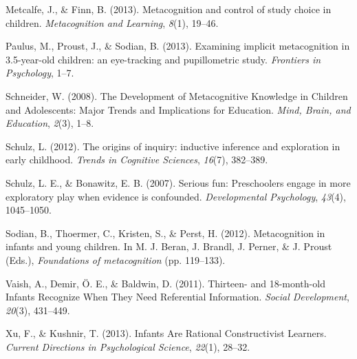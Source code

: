 \documentclass[10pt, letterpaper]{article}
\begin{document}
\hypertarget{ref-Metcalfe2013}{}
Metcalfe, J., \& Finn, B. (2013). Metacognition and control of study
choice in children. \emph{Metacognition and Learning}, \emph{8}(1),
19--46.

\hypertarget{ref-Paulus2013}{}
Paulus, M., Proust, J., \& Sodian, B. (2013). Examining implicit
metacognition in 3.5-year-old children: an eye-tracking and
pupillometric study. \emph{Frontiers in Psychology}, 1--7.

\hypertarget{ref-Schneider2008}{}
Schneider, W. (2008). The Development of Metacognitive Knowledge in
Children and Adolescents: Major Trends and Implications for Education.
\emph{Mind, Brain, and Education}, \emph{2}(3), 1--8.

\hypertarget{ref-Schulz2012}{}
Schulz, L. (2012). The origins of inquiry: inductive inference and
exploration in early childhood. \emph{Trends in Cognitive Sciences},
\emph{16}(7), 382--389.

\hypertarget{ref-Schulz2007}{}
Schulz, L. E., \& Bonawitz, E. B. (2007). Serious fun: Preschoolers
engage in more exploratory play when evidence is confounded.
\emph{Developmental Psychology}, \emph{43}(4), 1045--1050.

\hypertarget{ref-Sodian2012}{}
Sodian, B., Thoermer, C., Kristen, S., \& Perst, H. (2012).
Metacognition in infants and young children. In M. J. Beran, J. Brandl,
J. Perner, \& J. Proust (Eds.), \emph{Foundations of metacognition} (pp.
119--133).

\hypertarget{ref-Vaish2011}{}
Vaish, A., Demir, Ö. E., \& Baldwin, D. (2011). Thirteen- and
18-month-old Infants Recognize When They Need Referential Information.
\emph{Social Development}, \emph{20}(3), 431--449.

\hypertarget{ref-Xu2013}{}
Xu, F., \& Kushnir, T. (2013). Infants Are Rational Constructivist
Learners. \emph{Current Directions in Psychological Science},
\emph{22}(1), 28--32.
\end{document}

